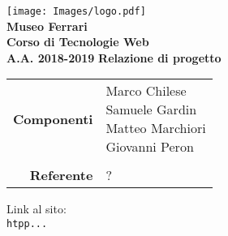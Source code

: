 


\begin{titlepage}
\thispagestyle{empty}

\begin{center}

\texttt{[image: Images/logo.pdf]}\\ 
\large \textbf{Museo Ferrari\\ \small Corso di Tecnologie Web\\ A.A. 2018-2019}
\vfill
\Huge \textbf{Relazione di progetto}
\vfill
\large
\renewcommand{\arraystretch}{1.3}
\begin{tabular}{r|l}
\textbf{Componenti} & \parbox[t]{5cm}{Marco Chilese\\Samuele Gardin\\Matteo Marchiori\\Giovanni Peron}\\
\-\\
\textbf{Referente} & \parbox[t]{5cm}{?}\\
\end{tabular}
\vfill
\small
Link al sito:\\
\texttt{htpp...}
\end{center}
\end{titlepage}

\pagebreak

\tableofcontents

\pagebreak




\pagebreak



\pagebreak



\pagebreak



\pagebreak





\pagebreak




